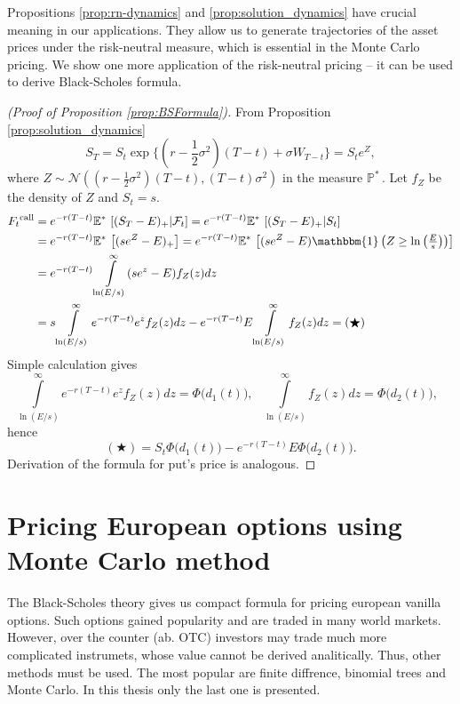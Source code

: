 \documentclass[a4paper,11pt, twoside]{book}
\theoremstyle{definition}
\theoremstyle{remark}
\def\Em{{\mathbb{E}^*}\,}
\def\Pm{{\mathbb{P}}^*\,}
\begin{document}
Propositions \ref{prop:rn-dynamics} and \ref{prop:solution_dynamics} have crucial meaning in our applications. They allow us to generate trajectories of the asset prices under the risk-neutral measure, which is essential in the Monte Carlo pricing. We show one more application of the risk-neutral pricing -- it can be used to derive Black-Scholes formula.
\begin{proof}[(Proof of Proposition \ref{prop:BSFormula})]
 From Proposition \ref{prop:solution_dynamics}
 \[ S_T = S_t \exp\bigl\{ (r - \frac{1}{2} \sigma^2)(T-t) + \sigma W_{T-t} \bigr\} = S_t e^Z, \]
 where $Z \sim \mathcal{N}\left((r - \frac{1}{2} \sigma^2)(T-t), (T-t)\sigma^2 \right)$ in the measure $\Pm$. Let $f_Z$ be the density of $Z$ and $S_t = s$.
 \begin{equation*}
  \begin{split}
    F_t\textsuperscript{call} &= e^{-r(T-t)} \Em\left[(S_T-E)_+ | \mathcal{F}_t \right] = e^{-r(T-t)} \Em\left[(S_T-E)_+ |S_t\right] \\
    &= e^{-r(T-t)} \Em\left[(s e^Z-E)_+ \right] = e^{-r(T-t)} \Em\left[(s e^Z-E) \mathbbm{1}\left({\textstyle Z \geq \ln\left(\frac{E}{s}\right)} \right) \right] \\
    &= e^{-r(T-t)} \int\limits_{\ln(E/s)}^\infty (se^z - E)f_Z(z) dz \\
    &= s\int\limits_{\ln(E/s)}^\infty e^{-r(T-t)}e^z f_Z(z) dz - e^{-r(T-t)} E\int\limits_{\ln(E/s)}^\infty f_Z(z) dz = (\bigstar)
  \end{split}
 \end{equation*}
 Simple calculation gives
 \[ \int\limits_{\ln(E/s)}^\infty e^{-r(T-t)}e^z f_Z(z) dz = \Phi\bigl( d_1(t) \bigr),  \ \ \ 
    \int\limits_{\ln(E/s)}^\infty f_Z(z) dz = \Phi\bigl( d_2(t) \bigr),  \ \ \ \]
 hence 
 \[ (\bigstar) = S_t \Phi\bigl( d_1(t) \bigr)  - e^{-r(T-t)} E \Phi\bigl( d_2(t) \bigr) . \]
 Derivation of the formula for put's price is analogous.
\end{proof}




\chapter[{Pricing European options using Monte Carlo method}]{Pricing European options using \\Monte Carlo method}
The Black-Scholes theory gives us compact formula for pricing european vanilla options. Such options gained popularity and are traded in many world markets. However, over the counter (ab. OTC) investors may trade much more complicated instrumets, whose value cannot be derived analitically. Thus, other methods must be used.
The most popular are finite diffrence, binomial trees and Monte Carlo. In this thesis only the last one is presented.
\end{document}
